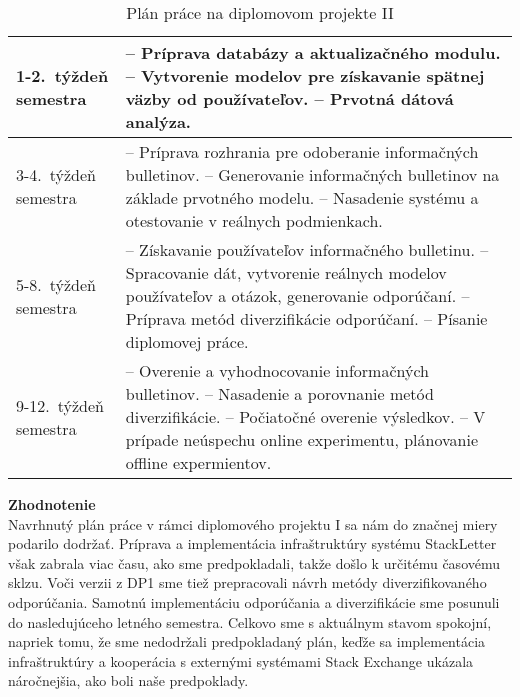 \begin{table}[h]
\centering
\caption{Plán práce na diplomovom projekte II}
\begin{tabular}{|m{2.3cm}|m{12cm}|}
\hline
1-2.~týždeň semestra   & -- Príprava databázy a aktualizačného modulu.
				\newline -- Vytvorenie modelov pre získavanie spätnej väzby od používateľov.
				\newline -- Prvotná dátová analýza.
				\\ \hline
3-4.~týždeň semestra   & -- Príprava rozhrania pre odoberanie informačných bulletinov.
				\newline -- Generovanie informačných bulletinov na základe prvotného modelu.
				\newline -- Nasadenie systému a otestovanie v reálnych podmienkach.
				\\ \hline
5-8.~týždeň semestra   & -- Získavanie používateľov informačného bulletinu.
				\newline -- Spracovanie dát, vytvorenie reálnych modelov používateľov a otázok, generovanie odporúčaní.
				\newline -- Príprava metód diverzifikácie odporúčaní.
				\newline -- Písanie diplomovej práce.
				\\ \hline
9-12.~týždeň semestra  & -- Overenie a vyhodnocovanie informačných bulletinov.
				\newline -- Nasadenie a porovnanie metód diverzifikácie.
				\newline -- Počiatočné overenie výsledkov.
				\newline -- V prípade neúspechu online experimentu, plánovanie offline expermientov.
				\\ \hline
\end{tabular}
\end{table}

\textbf{Zhodnotenie}\\
Navrhnutý plán práce v rámci diplomového projektu I sa nám do značnej miery podarilo dodržať. Príprava a implementácia
infraštruktúry systému StackLetter však zabrala viac času, ako sme predpokladali, takže došlo k určitému časovému sklzu.
Voči verzii z DP1 sme tiež prepracovali návrh metódy diverzifikovaného odporúčania. Samotnú implementáciu
odporúčania a diverzifikácie sme posunuli do nasledujúceho letného semestra. Celkovo sme s aktuálnym stavom spokojní,
napriek tomu, že sme nedodržali predpokladaný plán, keďže sa implementácia infraštruktúry a kooperácia s externými
systémami Stack Exchange ukázala náročnejšia, ako boli naše predpoklady.


